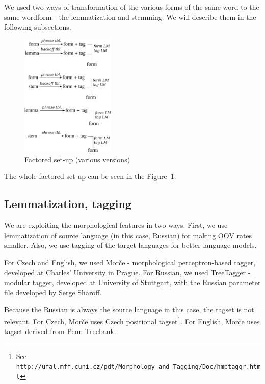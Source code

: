 \documentclass[11pt,letterpaper]{article}
\begin{document}
We used two ways of transformation of the various forms of the same word to the same wordform - the lemmatization and stemming. We will describe them in the following subsections.

\begin{figure}
\centering
\includegraphics[width=0.4\textwidth]{graf_moses}
\caption{Factored set-up (various versions)}
\label{graf:mss}
\end{figure}

The whole factored set-up can be seen in the Figure~\ref{graf:mss}.

\subsection{Lemmatization, tagging}



We are exploiting the morphological features in two ways. First, we use lemmatization of source language (in this case, Russian) for making OOV rates smaller. Also, we use tagging of the target languages for better language models.

For Czech and English, we used Morče - morphological perceptron-based tagger, developed at Charles' University in Prague. For Russian, we used TreeTagger - modular tagger, developed at University of Stuttgart, with the Russian parameter file developed by Serge Sharoff.

Because the Russian is always the source language in this case, the tagset is not relevant. For Czech, Morče uses Czech positional tagset\footnote{See \texttt{http://ufal.mff.cuni.cz/pdt/\-Mor\-pho\-logy\-\_\-and\-\_\-Tag\-ging\-/\-Doc/hmptagqr.html}}. For English, Morče uses tagset derived from Penn Treebank.
\end{document}
